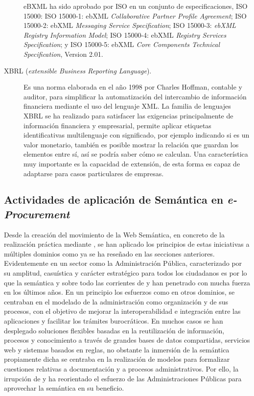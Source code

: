 \begin{description}
eBXML ha sido aprobado por \gls{ISO} en un conjunto de especificaciones, ISO 15000:  ISO 15000-1: ebXML \textit{Collaborative Partner Profile Agreement};
ISO 15000-2: ebXML \textit{Messaging Service Specification}; ISO 15000-3: \textit{ebXML Registry Information Model}; ISO 15000-4: ebXML \textit{Registry Services Specification};
y ISO 15000-5: ebXML \textit{Core Components Technical Specification}, Version 2.01.

\item [\gls{XBRL} (\textit{extensible Business Reporting Language}).] 
Es una norma elaborada en el año 1998 por Charles Hoffman, contable y auditor, para
simplificar la automatización del intercambio de información financiera mediante
el uso del lenguaje XML. La familia de lenguajes XBRL se ha realizado para
satisfacer las exigencias principalmente de información financiera y
empresarial, permite aplicar etiquetas identificativas multilenguaje con
significado, por ejemplo indicando si es un valor monetario, también es posible
mostrar la relación que guardan los elementos entre sí, así se podría saber cómo se
calculan. Una característica muy importante es la capacidad de extensión, de
esta forma es capaz de adaptarse para casos particulares de empresas. 

\end{description}

\subsection{Actividades de aplicación de Semántica en \textit{e-Procurement}}
Desde la creación del movimiento de la Web Semántica, en concreto de la realización
práctica mediante \linkeddata, se han aplicado los principios de estas iniciativas a múltiples
dominios como ya se ha reseñado en las secciones anteriores. Evidentemente en un sector como 
la Administración Pública, caracterizado por su amplitud, casuística y carácter estratégico para todos los ciudadanos
es por lo que la semántica y sobre todo las corrientes de \opendata y \linkeddata han penetrado con mucha fuerza en los últimos años. 
En un principio los esfuerzos como en otros dominios, se centraban en el modelado de la administración
como organización y de sus procesos, con el objetivo de mejorar la interoperabilidad e integración
entre las aplicaciones y facilitar los trámites burocráticos. En muchos casos se han desplegado
soluciones flexibles basadas en la reutilización de información, procesos y conocimiento a través
de grandes bases de datos compartidas, servicios web y sistemas basados en reglas, no obstante la inmersión
de la semántica propiamente dicha se centraba en la realización de modelos para formalizar
cuestiones relativas a documentación y a procesos administrativos. Por ello,
la irrupción de \opendata y \linkeddata ha reorientado el esfuerzo de las Administraciones Públicas
para aprovechar la semántica en su beneficio. 

